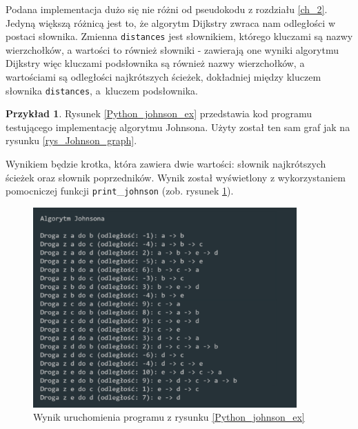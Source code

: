 \documentclass[12pt,a4paper]{book}
\theoremstyle{definition}
\newtheorem{ex}{Przykład}
\numberwithin{equation}{chapter}
\begin{document}
Podana implementacja dużo się nie różni od pseudokodu z rozdziału \ref{ch_2}. Jedyną większą różnicą jest to, że algorytm Dijkstry zwraca nam odległości w postaci słownika. Zmienna \texttt{distances} jest słownikiem, którego kluczami są nazwy wierzchołków, a wartości to również słowniki - zawierają one wyniki algorytmu Dijkstry więc kluczami podsłownika są również nazwy wierzchołków, a wartościami są odległości najkrótszych ścieżek, dokładniej między kluczem słownika \texttt{distances}, a~kluczem podsłownika.

\begin{ex}
Rysunek \ref{Python_johnson_ex} przedstawia kod programu testującego implementację algorytmu Johnsona. Użyty został ten sam graf jak na rysunku \ref{rys_Johnson_graph}.



Wynikiem będzie krotka, która zawiera dwie wartości: słownik najkrótszych ścieżek oraz słownik poprzedników. Wynik został wyświetlony z wykorzystaniem pomocniczej funkcji \texttt{print}\_\texttt{johnson} (zob. rysunek \ref{rys_wynik_johnson}).

\begin{figure}[!htp]
\centering
\includegraphics[width=0.9\textwidth]{images/johnson_example.pdf}
\caption{Wynik uruchomienia programu z rysunku \ref{Python_johnson_ex}}
\label{rys_wynik_johnson}
\end{figure}
\end{ex}
\end{document}
